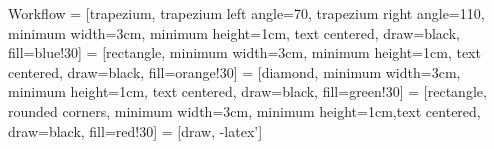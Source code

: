 \documentclass[12pt]{beamer}
\begin{document}
  \begin{frame}{Workflow}
     = [trapezium, trapezium left angle=70, trapezium right angle=110, minimum width=3cm, minimum height=1cm, text centered, draw=black, fill=blue!30]
     = [rectangle, minimum width=3cm, minimum height=1cm, text centered, draw=black, fill=orange!30]
     = [diamond, minimum width=3cm, minimum height=1cm, text centered, draw=black, fill=green!30]
     = [rectangle, rounded corners, minimum width=3cm, minimum height=1cm,text centered, draw=black, fill=red!30]
     = [draw, -latex']

\centering
  \end{frame}
\end{document}
